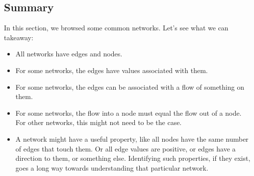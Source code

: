 \subsection{Summary}
In this section, we browsed some common networks. Let's see what we can takeaway:
\begin{itemize}
\item All networks have edges and nodes.
\item For some networks, the edges have values associated with them.
\item For some networks, the edges can be associated with a flow of something on them.
\item For some networks, the flow into a node must equal the flow out of a node. For other networks, this might not need to be the case.
\item A network might have a useful property, like all nodes have the same number of edges that touch them. Or all edge values are positive, or edges have a direction to them, or something else. Identifying such properties, if they exist, goes a long way towards understanding that particular network.
\end{itemize}



